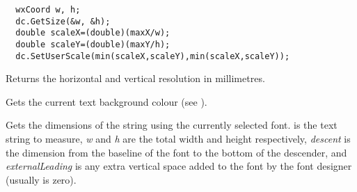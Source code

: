 \begin{verbatim}
  wxCoord w, h;
  dc.GetSize(&w, &h);
  double scaleX=(double)(maxX/w);
  double scaleY=(double)(maxY/h);
  dc.SetUserScale(min(scaleX,scaleY),min(scaleX,scaleY));
\end{verbatim}



\label{wxdcgetsizemm}



Returns the horizontal and vertical resolution in millimetres.

\label{wxdcgettextbackground}


Gets the current text background colour (see ).


\label{wxdcgettextextent}


Gets the dimensions of the string using the currently selected font.
 is the text string to measure, {\it w} and {\it h} are
the total width and height respectively, {\it descent} is the
dimension from the baseline of the font to the bottom of the
descender, and {\it externalLeading} is any extra vertical space added
to the font by the font designer (usually is zero).

